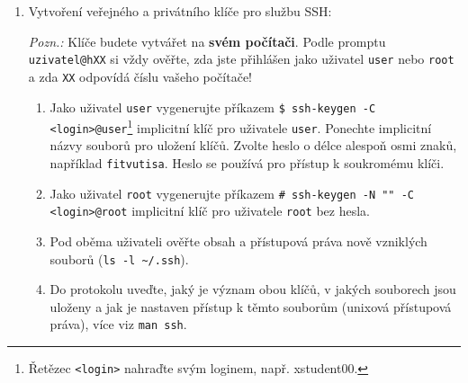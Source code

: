 \documentclass[a4paper,11pt]{article}
\begin{document}
\begin{enumerate}
  \item Vytvoření veřejného a privátního klíče pro službu SSH:

  {\em Pozn.:} Klíče budete vytvářet na {\bf svém počítači}. Podle promptu \verb|uzivatel@hXX| si vždy ověřte, zda jste přihlášen jako uživatel {\tt user} nebo {\tt root} a zda \verb|XX| odpovídá číslu vašeho počítače!
    \begin{enumerate}
      \item Jako uživatel {\tt user} vygenerujte příkazem \verb|$ ssh-keygen -C <login>@user|\footnote{Řetězec {\tt <login>} nahraďte svým loginem, např. xstudent00.} implicitní klíč pro uživatele {\tt user}. Ponechte implicitní názvy souborů pro uložení klíčů. Zvolte heslo o délce alespoň osmi znaků, například \texttt{fitvutisa}. Heslo se používá pro přístup k soukromému klíči.
      \item Jako uživatel {\tt root} vygenerujte příkazem \verb|# ssh-keygen -N "" -C <login>@root|
        implicitní klíč pro uživatele {\tt root} bez hesla.
      \item Pod oběma uživateli ověřte obsah a přístupová práva nově vzniklých souborů (\verb|ls -l ~/.ssh|).
      \item Do protokolu uveďte, jaký je význam obou klíčů, v jakých souborech jsou uloženy a jak je nastaven přístup k těmto souborům (unixová přístupová práva), více viz {\tt man ssh}.
    \end{enumerate}


\end{enumerate}
\end{document}
